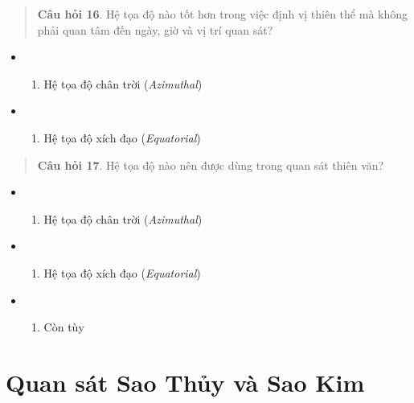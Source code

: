 \documentclass[
]{book}
\providecommand{\tightlist}{%
  \setlength{\itemsep}{0pt}\setlength{\parskip}{0pt}}
\begin{document}
\begin{quote}
\textbf{Câu hỏi 16}. Hệ tọa độ nào tốt hơn trong việc định vị thiên thể mà không phải quan tâm đến ngày, giờ và vị trí quan sát?
\end{quote}

\begin{itemize}
\tightlist
\item
  \begin{enumerate}
  \def\labelenumi{(\Alph{enumi})}
  \tightlist
  \item
    Hệ tọa độ chân trời (\emph{Azimuthal})\\
  \end{enumerate}
\item
  \begin{enumerate}
  \def\labelenumi{(\Alph{enumi})}
  \setcounter{enumi}{1}
  \tightlist
  \item
    Hệ tọa độ xích đạo (\emph{Equatorial})
  \end{enumerate}
\end{itemize}

\begin{quote}
\textbf{Câu hỏi 17}. Hệ tọa độ nào nên được dùng trong quan sát thiên văn?
\end{quote}

\begin{itemize}
\tightlist
\item
  \begin{enumerate}
  \def\labelenumi{(\Alph{enumi})}
  \tightlist
  \item
    Hệ tọa độ chân trời (\emph{Azimuthal})\\
  \end{enumerate}
\item
  \begin{enumerate}
  \def\labelenumi{(\Alph{enumi})}
  \setcounter{enumi}{1}
  \tightlist
  \item
    Hệ tọa độ xích đạo (\emph{Equatorial})\\
  \end{enumerate}
\item
  \begin{enumerate}
  \def\labelenumi{(\Alph{enumi})}
  \setcounter{enumi}{2}
  \tightlist
  \item
    Còn tùy
  \end{enumerate}
\end{itemize}

\chapter{Quan sát Sao Thủy và Sao Kim}\label{quan-suxe1t-sao-thux1ee7y-vuxe0-sao-kim}
\end{document}
